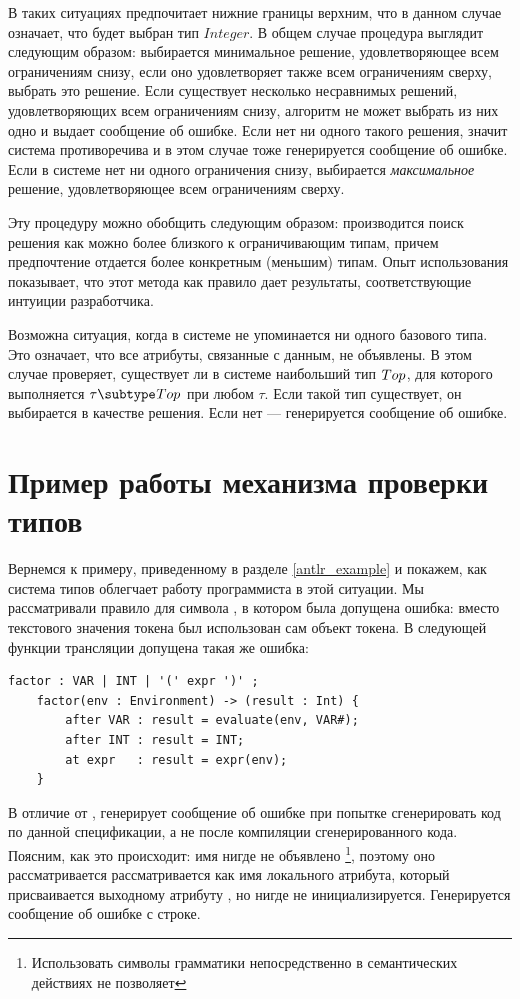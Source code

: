 В таких ситуациях \ATF{} предпочитает нижние границы верхним, что в данном случае означает, что будет выбран тип $Integer$. В общем случае процедура выглядит следующим образом: выбирается минимальное решение, удовлетворяющее всем ограничениям снизу, если оно удовлетворяет также всем ограничениям сверху, выбрать это решение. Если существует несколько несравнимых решений, удовлетворяющих всем ограничениям снизу, алгоритм не может выбрать из них одно и выдает сообщение об ошибке. Если нет ни одного такого решения, значит система противоречива и в этом случае тоже генерируется сообщение об ошибке. Если в системе нет ни одного ограничения снизу, выбирается \emph{максимальное} решение, удовлетворяющее всем ограничениям сверху.

Эту процедуру можно обобщить следующим образом: производится поиск решения как можно более близкого к ограничивающим типам, причем предпочтение отдается более конкретным (меньшим) типам. Опыт использования \ATF{} показывает, что этот метода как правило дает результаты, соответствующие интуиции разработчика.

Возможна ситуация, когда в системе не упоминается ни одного базового типа. Это означает, что все атрибуты, связанные с данным, не объявлены. В этом случае \ATF{} проверяет, существует ли в системе наибольший тип $Top_{}$, для которого выполняется $\tau \lel Top_\L$ при любом $\tau$. Если такой тип существует, он выбирается в качестве решения. Если нет --- генерируется сообщение об ошибке.

\section{Пример работы механизма проверки типов}
Вернемся к примеру, приведенному в разделе \ref{antlr_example} и покажем, как система типов \ATF{} облегчает работу программиста в этой ситуации. Мы рассматривали правило для символа , в котором была допущена ошибка: вместо текстового значения токена  был использован сам объект токена. В следующей функции трансляции допущена такая же ошибка:
\begin{lstlisting}
factor : VAR | INT | '(' expr ')' ;          
	factor(env : Environment) -> (result : Int) { 
		after VAR : result = evaluate(env, VAR#);  
		after INT : result = INT;
		at expr   : result = expr(env);           
	}
\end{lstlisting}
В отличие от , \ATF{} генерирует сообщение об ошибке при попытке сгенерировать код по данной спецификации, а не после компиляции сгенерированного кода. Поясним, как это происходит: имя  нигде не объявлено \footnote{Использовать символы грамматики непосредственно в семантических действиях \ATF{} не позволяет}, поэтому оно рассматривается рассматривается как имя локального атрибута, который присваивается выходному атрибуту , но нигде не инициализируется. Генерируется сообщение об ошибке с строке.

